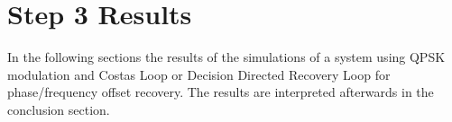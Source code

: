 \documentclass[]{article}
\begin{document}
\newpage
\section{Step 3 Results}
In the following sections the results of the simulations of a system using QPSK modulation and Costas Loop or Decision Directed Recovery Loop for phase/frequency offset recovery. The results are interpreted afterwards in the conclusion section.

%
%
%
%
\end{document}

